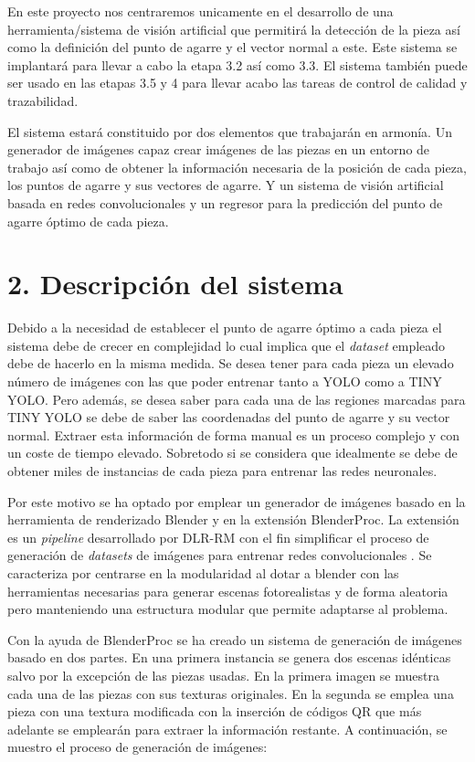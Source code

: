 {En este proyecto nos centraremos unicamente en el desarrollo de una herramienta/sistema de visión artificial que permitirá la detección de la pieza así como la definición del punto de agarre y el vector normal a este. Este sistema se implantará para llevar a cabo la etapa 3.2 así como 3.3. El sistema también puede ser usado en las etapas 3.5 y 4 para llevar acabo las tareas de control de calidad y trazabilidad.

El sistema estará constituido por dos elementos que trabajarán en armonía. Un generador de imágenes capaz crear imágenes de las piezas en un entorno de trabajo así como de obtener la información necesaria de la posición de cada pieza, los puntos de agarre y sus vectores de agarre. Y un sistema de visión artificial basada en redes convolucionales y un regresor para la predicción del punto de agarre óptimo de cada pieza.

\section*{2. Descripción del sistema}
Debido a la necesidad de establecer el punto de agarre óptimo a cada pieza el sistema debe de crecer en complejidad lo cual implica que el \textit{dataset} empleado debe de hacerlo en la misma medida. Se desea tener para cada pieza un elevado número de imágenes con las que poder entrenar tanto a YOLO como a TINY YOLO. Pero además, se desea saber para cada una de las regiones marcadas para TINY YOLO se debe de saber las coordenadas del punto de agarre y su vector normal. Extraer esta información de forma manual es un proceso complejo y con un coste de tiempo elevado. Sobretodo si se considera que idealmente se debe de obtener miles de instancias de cada pieza para entrenar las redes neuronales.

Por este motivo se ha optado por emplear un generador de imágenes basado en la herramienta de renderizado Blender y en la extensión BlenderProc. La extensión es un \textit{pipeline} desarrollado por DLR-RM con el fin simplificar el proceso de generación de \textit{datasets} de imágenes para entrenar redes convolucionales \citep{denninger2019blenderproc}. Se caracteriza por centrarse en la modularidad al dotar a blender con las herramientas necesarias para generar escenas fotorealistas y de forma aleatoria pero manteniendo una estructura modular que permite adaptarse al problema.

Con la ayuda de BlenderProc se ha creado un sistema de generación de imágenes basado en dos partes. En una primera instancia se genera dos escenas idénticas salvo por la excepción de las piezas usadas. En la primera imagen se muestra cada una de las piezas con sus texturas originales. En la segunda se emplea una pieza con una textura modificada con la inserción de códigos QR que más adelante se emplearán para extraer la información restante. A continuación, se muestro el proceso de generación de imágenes:

}

